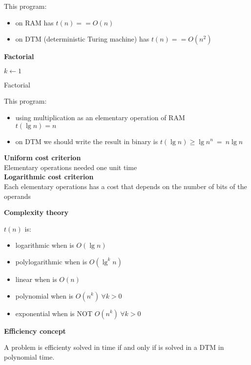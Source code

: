 This program:

\begin{itemize}
 \item on RAM has $t(n) == O(n)$
 \item on DTM (deterministic Turing machine) has $t(n) == O(n^2)$
\end{itemize}

\textbf{Factorial}

\begin{algorithm}[H]
 \SetAlgoLined
 $k \gets 1$\\
 \caption{Factorial}
\end{algorithm}

This program:\\

\begin{itemize}
 \item using multiplication as an elementary operation of RAM\\
$t(\lg{n}) = n$
 \item on DTM we should write the result in binary is $t(\lg{n}) \geq \lg{n^n} \ = \ n \lg{n}$
\end{itemize}

\textbf{Uniform cost criterion}\\
Elementary operations needed one unit time\\

\textbf{Logarithmic cost criterion}\\
Each elementary operations has a cost that depends on the number of bits of the operands

\textbf{Complexity theory}

$t(n)$ is:\\
\begin{itemize}
 \item logarithmic when is $O(\lg{n})$
 \item polylogarithmic when is $O(\lg^k{n})$
 \item linear when is $O(n)$
 \item polynomial when is $O(n^k) \ \forall k>0$ 
 \item exponential when is NOT $O(n^k) \ \forall k>0$ 
\end{itemize}

\textbf{Efficiency concept}

\begin{definition}
A problem is efficienty solved in time if and only if is solved in a DTM in polynomial time.
\end{definition}

